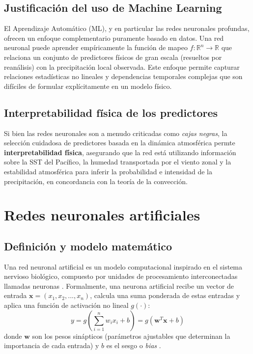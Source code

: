 \subsection{Justificación del uso de Machine Learning}
El Aprendizaje Automático (ML), y en particular las redes neuronales profundas, ofrecen un enfoque complementario puramente basado en datos. Una red neuronal puede aprender empíricamente la función de mapeo \(f: \mathbb{R}^n \to \mathbb{R}\) que relaciona un conjunto de predictores físicos de gran escala (resueltos por reanálisis) con la precipitación local observada. Este enfoque permite capturar relaciones estadísticas no lineales y dependencias temporales complejas que son difíciles de formular explícitamente en un modelo físico.

\subsection{Interpretabilidad física de los predictores}
Si bien las redes neuronales son a menudo criticadas como \textit{cajas negras}, la selección cuidadosa de predictores basada en la dinámica atmosférica permte \textbf{interpretabilidad física}, asegurando que la red está utilizando información sobre la SST del Pacífico, la humedad transportada por el viento zonal y la estabilidad atmosférica para inferir la probabilidad e intensidad de la precipitación, en concordancia con la teoría de la convección.

\section{Redes neuronales artificiales}

\subsection{Definición y modelo matemático}
Una red neuronal artificial es un modelo computacional inspirado en el sistema nervioso biológico, compuesto por unidades de procesamiento interconectadas llamadas neuronas \citep{salas2004redes, izaurieta2000redes}. Formalmente, una neurona artificial recibe un vector de entrada \(\mathbf{x} = (x_1, x_2, ..., x_n)\), calcula una suma ponderada de estas entradas y aplica una función de activación no lineal \(g(\cdot)\):
\begin{equation}
    y = g\left( \sum_{i=1}^{n} w_i x_i + b \right) = g(\mathbf{w}^T \mathbf{x} + b)
\end{equation}
donde \(\mathbf{w}\) son los pesos sinápticos (parámetros ajustables que determinan la importancia de cada entrada) y \(b\) es el sesgo o \textit{bias} \citep{ellacott2012mathematics}.

